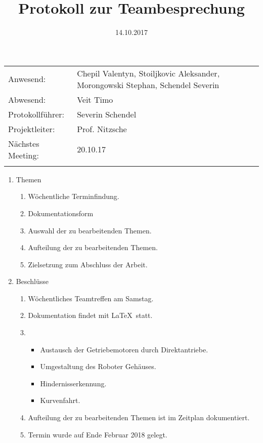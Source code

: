 \documentclass[10pt]{scrartcl}
\title{Protokoll zur Teambesprechung}
\date{14.10.2017}%
\begin{document}
\maketitle
\thispagestyle{empty}

\begin{tabularx}{\textwidth}{lp{10 cm}} 
Anwesend: & Chepil Valentyn, Stoiljkovic Aleksander, Morongowski Stephan, Schendel Severin\\%
Abwesend: & Veit Timo\\
Protokollführer: & Severin Schendel \\
Projektleiter: & Prof. Nitzsche\\
Nächstes Meeting: & 20.10.17 \\%
&\\
\end{tabularx}

\begin{enumerate}
	\item Themen
		\begin{enumerate}
			\item Wöchentliche Terminfindung.%
			\item Dokumentationsform
			\item Auswahl der zu bearbeitenden Themen.
			\item Aufteilung der zu bearbeitenden Themen.
			\item Zielsetzung zum Abschluss der Arbeit.
		\end{enumerate}
	\item Beschlüsse
		\begin{enumerate}
			\item Wöchentliches Teamtreffen am Samstag.%
			\item Dokumentation findet mit \LaTeX\ statt.
			\item \begin{itemize}
				\item Austausch der Getriebemotoren durch Direktantriebe. 
				\item Umgestaltung des Roboter Gehäuses.
				\item Hindernisserkennung.
				\item Kurvenfahrt.
			\end{itemize}
			\item Aufteilung der zu bearbeitenden Themen ist im Zeitplan dokumentiert.
			\item Termin wurde auf Ende Februar 2018 gelegt.
		\end{enumerate}

	\end{enumerate}
\end{document}
